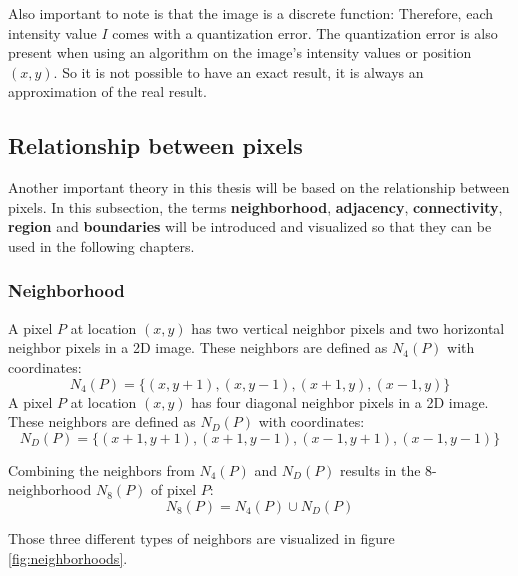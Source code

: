 Also important to note is that the image is a discrete function: Therefore, each intensity value $I$ comes with a quantization error. The quantization error is also present when using an algorithm on the image's intensity values or position $(x,y)$. So it is not possible to have an exact result, it is always an approximation of the real result.

\subsection{Relationship between pixels}
Another important theory in this thesis will be based on the relationship between pixels. In this subsection, the terms \textbf{neighborhood}, \textbf{adjacency}, \textbf{connectivity}, \textbf{region} and \textbf{boundaries} will be introduced and visualized so that they can be used in the following chapters. 

\subsubsection{Neighborhood}
A pixel $P$ at location $(x,y)$ has two vertical neighbor pixels and two horizontal neighbor pixels in a 2D image. These neighbors are defined as $N_4(P)$ with coordinates: 
\begin{equation}
        N_4(P) = \{(x,y+1),(x,y-1),(x+1,y),(x-1,y)\}
\end{equation}
A pixel $P$ at location $(x,y)$ has four diagonal neighbor pixels in a 2D image. These neighbors are defined as $N_D(P)$ with coordinates:
\begin{equation}
    N_D(P) = \{(x+1,y+1),(x+1,y-1),(x-1,y+1),(x-1,y-1)\}
\end{equation}

Combining the neighbors from $N_4(P)$ and $N_D(P)$ results in the 8-neighborhood $N_8(P)$ of pixel $P$:
\begin{equation}
    N_8(P) = N_4(P) \cup N_D(P)
\end{equation}

Those three different types of neighbors are visualized in figure \ref{fig:neighborhoods}.

